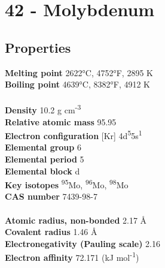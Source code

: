 \section{42 - Molybdenum}
\label{sec:elem-molybdenum}
\subsection{Properties}
\textbf{Melting point} 2622°C, 4752°F, 2895 K\\
\textbf{Boiling point} 4639°C, 8382°F, 4912 K\\
\\
\textbf{Density} 10.2 g cm\textsuperscript{-3}\\
\textbf{Relative atomic mass} 95.95\\
\textbf{Electron configuration} [Kr] 4d\textsuperscript{5}5s\textsuperscript{1}\\
\textbf{Elemental group} 6\\
\textbf{Elemental period} 5\\
\textbf{Elemental block} d\\
\textbf{Key isotopes} \textsuperscript{95}Mo, \textsuperscript{96}Mo, \textsuperscript{98}Mo \\
\textbf{CAS number} 7439-98-7\\
\\
\textbf{Atomic radius, non-bonded} 2.17 Å\\
\textbf{Covalent radius} 1.46 Å\\
\textbf{Electronegativity (Pauling scale)} 2.16\\
\textbf{Electron affinity} 72.171 (kJ mol\textsuperscript{-1})\\